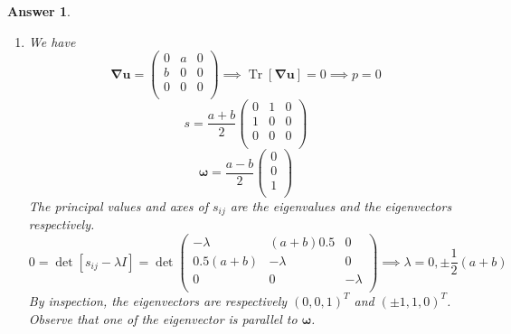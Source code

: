 \documentclass[a4paper]{article}
\DeclareMathOperator{\Tr}{Tr}
\newtheorem{ans}{Answer}[section]
\theoremstyle{new}
\begin{document}
\begin{ans}
\begin{enumerate}[label=(\roman*)]
$$\epsilon_{ijl}A_{ij}=\epsilon_{ijl}\epsilon_{ijk}\omega_k=(\delta_{jj}\delta_{lk}-\delta_{jk}\delta_{lj})\omega_k=(3\delta_{lk}-\delta_{kl})\omega_k=2\delta_{lk}\omega_k\implies\omega_k=\frac{1}{2}\epsilon_{ijk}A_{ij}$$
By inspection, we see that $$s_{ij}=\frac{1}{2}\bigg(\frac{\partial u_i}{\partial x_j}-\frac{\Tr(\boldsymbol{\nabla}\mathbf{u})}{\Tr(I_{2\times 2})}\delta_{ij}\bigg),\quad p=\frac{\Tr(\boldsymbol{\nabla}\mathbf{u})}{\Tr(I_{2\times 2})},\quad \omega_k=\frac{1}{2}\epsilon_{ijk}\frac{1}{2}\bigg(\frac{\partial u_i}{\partial x_j}-\frac{\partial u_j}{\partial x_i}\bigg)$$
\item We have
$$\boldsymbol{\nabla}\mathbf{u}=\begin{pmatrix}0&a&0\\b&0&0\\0&0&0\\\end{pmatrix}\implies\Tr[\boldsymbol{\nabla}\mathbf{u}]=0\implies p=0$$
$$s=\frac{a+b}{2}\begin{pmatrix}0&1&0\\1&0&0\\0&0&0\\\end{pmatrix}$$
$$\boldsymbol{\omega}=\frac{a-b}{2}\begin{pmatrix}0\\0\\1\\\end{pmatrix}$$
The principal values and axes of $s_{ij}$ are the eigenvalues and the eigenvectors respectively.
$$0=\det[s_{ij}-\lambda I]=\det\begin{pmatrix}-\lambda&(a+b)0.5&0\\0.5(a+b)&-\lambda&0\\0&0&-\lambda\\\end{pmatrix}\implies\lambda=0,\pm\frac{1}{2}(a+b)$$
By inspection, the eigenvectors are respectively $(0,0,1)^T$ and $(\pm1,1,0)^T$. Observe that one of the eigenvector is parallel to $\boldsymbol{\omega}$.
\end{enumerate}
\end{ans}
\newpage
\end{document}
